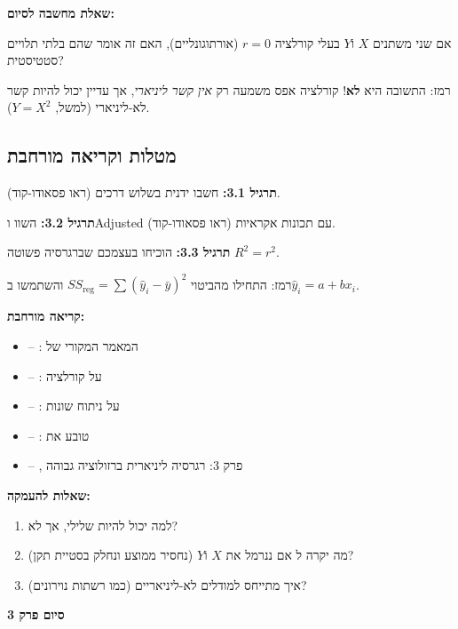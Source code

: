 \textbf{שאלת מחשבה לסיום:}

אם שני משתנים $X$ ו\en{-}$Y$ בעלי קורלציה $r = \num{0}$ (אורתוגונליים), האם זה אומר שהם בלתי תלויים סטטיסטית?

רמז: התשובה היא \textbf{לא}! קורלציה אפס משמעה רק \textit{אין קשר ליניארי}, אך עדיין יכול להיות קשר לא-ליניארי (למשל, $Y = X^2$).

\subsection*{מטלות וקריאה מורחבת}

\textbf{תרגיל \num{3.1}:} חשבו \Rsquared{} ידנית בשלוש דרכים (ראו פסאודו-קוד).

\textbf{תרגיל \num{3.2}:} השוו \Rsquared{} ו\en{-}Adjusted \Rsquared{} עם תכונות אקראיות (ראו פסאודו-קוד).

\textbf{תרגיל \num{3.3}:} הוכיחו בעצמכם שברגרסיה פשוטה $R^2 = r^2$.

רמז: התחילו מהביטוי $SS_{\text{reg}} = \sum (\hat{y}_i - \bar{y})^2$ והשתמשו ב\en{-}$\hat{y}_i = a + bx_i$.

\textbf{קריאה מורחבת:}

\begin{itemize}
\item \cite{galton1886} – : המאמר המקורי של 
\item \cite{pearson1896} – :  על קורלציה
\item \cite{fisher1925} – :  על ניתוח שונות
\item \cite{wright1921} – :  טובע את \Rsquared{}
\item \cite{hastie2009} – , פרק \num{3}: רגרסיה ליניארית ברזולוציה גבוהה
\end{itemize}

\textbf{שאלות להעמקה:}

\begin{enumerate}
\item למה  יכול להיות שלילי, אך \Rsquared{} לא?
\item מה יקרה ל\en{-}\Rsquared{} אם ננרמל את $X$ ו\en{-}$Y$ (נחסיר ממוצע ונחלק בסטיית תקן)?
\item איך \Rsquared{} מתייחס למודלים לא-ליניאריים (כמו רשתות נוירונים)?
\end{enumerate}

\textbf{סיום פרק \num{3}}